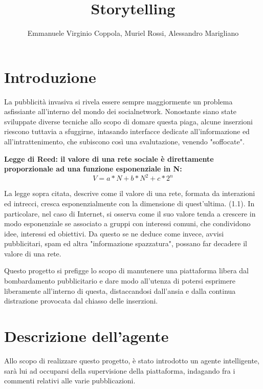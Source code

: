 \documentclass{report}
\title{Storytelling} %
\author{Emmanuele Virginio Coppola, Muriel Rossi, Alessandro Marigliano} %
\begin{document}
    \maketitle %

    \tableofcontents
    \chapter{Introduzione} %
    
    La pubblicità invasiva si rivela essere sempre maggiormente un problema asfissiante all'interno del mondo dei socialnetwork. Nonostante siano state sviluppate diverse tecniche
    allo scopo di domare questa piaga, alcune inserzioni riescono tuttavia a sfuggirne, intasando interfacce dedicate all'informazione ed 
    all'intrattenimento, che subiscono così una svalutazione, venendo "soffocate".
    

    \textbf{Legge di Reed: il valore di una rete sociale è direttamente proporzionale ad una funzione esponenziale in N:}
    \begin{equation} %
        V=a*N+b*N^2 + c*2^n
    \end{equation}
    

    La legge sopra citata, descrive come il valore di una rete, formata da interazioni ed intrecci, cresca esponenzialmente con la dimensione di quest'ultima. (1.1).
    In particolare, nel caso di Internet, si osserva come il suo valore tenda a crescere in modo esponenziale se associato a gruppi con interessi
     comuni, che condividono idee, interessi ed obiettivi.
    Da questo se ne deduce come invece, avvisi pubblicitari, spam ed altra "informazione spazzatura", possano far decadere il valore di una rete.
    
    Questo progetto si prefigge lo scopo di manutenere una piattaforma libera dal bombardamento pubblicitario e dare modo all'utenza di potersi esprimere liberamente
    all'interno di questa, distaccandosi dall'ansia e dalla continua distrazione provocata dal chiasso delle inserzioni.
    \chapter{Descrizione dell'agente}
    Allo scopo di realizzare questo progetto, è stato introdotto un agente intelligente, sarà lui ad occuparsi della supervisione della piattaforma, indagando fra i 
    commenti relativi alle varie pubblicazioni.
\end{document}
